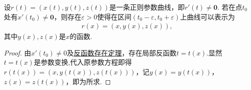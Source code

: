 \documentclass[../../main.tex]{subfiles}%
\begin{document}
\begin{theorem}[正则参数曲线的显式形式]
设$r(t)=(x(t),y(t),z(t))$是一条正则参数曲线，即$r'(t)\neq \bm{0}$. 若在点$t_0$处有$x'(t_0)\neq \bm{0}$，则存在$\varepsilon>0$使得在区间$(t_0-\varepsilon,t_0+\varepsilon)$上曲线可以表示为
\begin{align}\label{eq::-2jrj03j0wjo8f0jwfdsjge389hfgjp4e}
r(x)=(x,y(x),z(x)),
\end{align}
其中$y(x),z(x)$是$x$的函数.
\end{theorem}
\begin{proof}

由$x'(t_0)\neq 0$及\hyperref[Basis-of-Analytics-theorem:反函数存在定理]{反函数存在定理}，存在局部反函数$t=t(x)$.显然$t=t(x)$是参数变换,代入原参数方程即得$r(t(x))=(x,y(t(x)),z(t(x)))$，记$y(x)=y(t(x))$，$z(x)=z(t(x))$，即为所求.

\end{proof}
\end{document}
